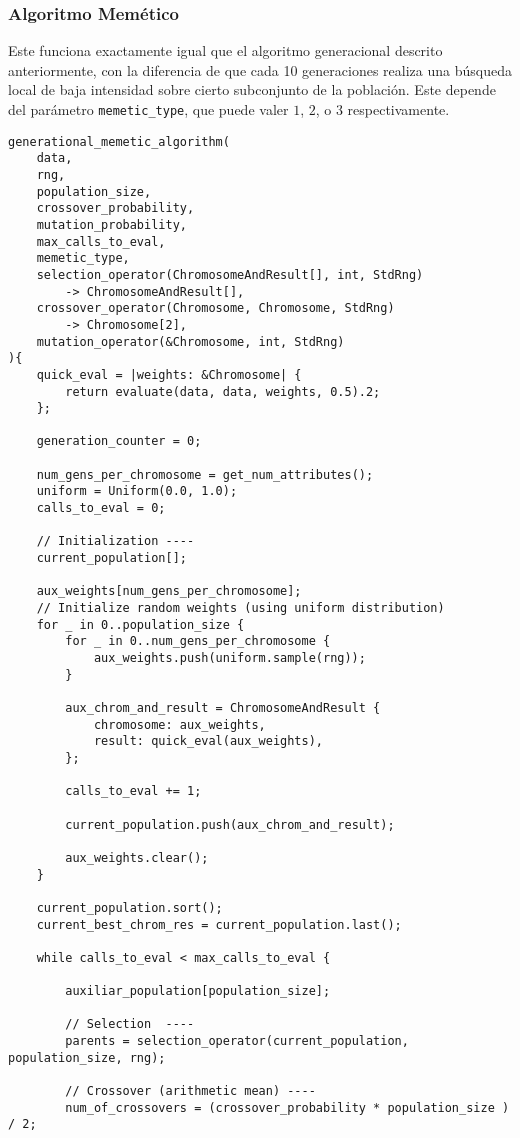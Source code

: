 \documentclass[size=a4, parskip=half, titlepage=false, toc=flat, toc=bib, 12pt]{scrartcl}
\begin{document}
\subsubsection{Algoritmo Memético}
Este funciona exactamente igual que el algoritmo generacional descrito anteriormente, con la diferencia de que cada 10 generaciones realiza una búsqueda local de baja intensidad sobre cierto subconjunto de la población. Este depende del parámetro \texttt{memetic\_type}, que puede valer $1$, $2$, o $3$ respectivamente.
\begin{verbatim}
generational_memetic_algorithm(
    data,
    rng,
    population_size,
    crossover_probability,
    mutation_probability,
    max_calls_to_eval,
    memetic_type,
    selection_operator(ChromosomeAndResult[], int, StdRng)
        -> ChromosomeAndResult[],
    crossover_operator(Chromosome, Chromosome, StdRng)
        -> Chromosome[2],
    mutation_operator(&Chromosome, int, StdRng)
){
    quick_eval = |weights: &Chromosome| {
        return evaluate(data, data, weights, 0.5).2;
    };

    generation_counter = 0;

    num_gens_per_chromosome = get_num_attributes();
    uniform = Uniform(0.0, 1.0);
    calls_to_eval = 0;

    // Initialization ----
    current_population[];

    aux_weights[num_gens_per_chromosome];
    // Initialize random weights (using uniform distribution)
    for _ in 0..population_size {
        for _ in 0..num_gens_per_chromosome {
            aux_weights.push(uniform.sample(rng));
        }

        aux_chrom_and_result = ChromosomeAndResult {
            chromosome: aux_weights,
            result: quick_eval(aux_weights),
        };

        calls_to_eval += 1;

        current_population.push(aux_chrom_and_result);

        aux_weights.clear();
    }

    current_population.sort();
    current_best_chrom_res = current_population.last();

    while calls_to_eval < max_calls_to_eval {

        auxiliar_population[population_size];

        // Selection  ----
        parents = selection_operator(current_population, population_size, rng);

        // Crossover (arithmetic mean) ----
        num_of_crossovers = (crossover_probability * population_size ) / 2;


\end{verbatim}
\end{document}
